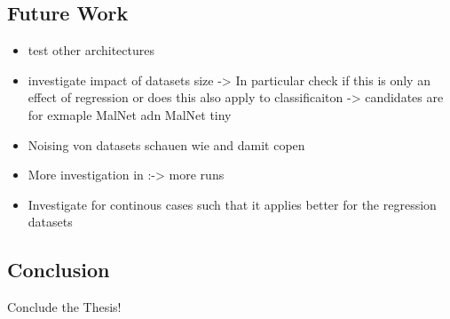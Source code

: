 \subsection{Future Work}
\begin{itemize}
	\item test other \gnn architectures
	\item investigate impact of datasets size -> In particular check if this is only an effect of regression or does this also apply to classificaiton -> candidates are for exmaple MalNet adn MalNet tiny
	\item Noising von datasets schauen wie \wlnn and \gnn damit copen
	\item More investigation in \wl:\gnn -> more runs
	\item Investigate \wl for continous cases such that it applies better for the regression datasets
\end{itemize}

\subsection{Conclusion}
Conclude the Thesis!

